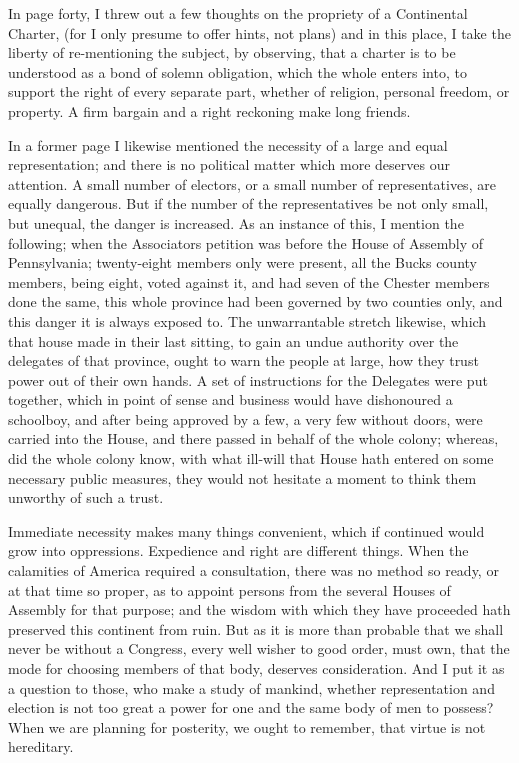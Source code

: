 \documentclass[12pt,oneside]{memoir}
\begin{document}
In page forty, I threw out a few thoughts on the propriety of a
Continental Charter, (for I only presume to offer hints, not plans)
and in this place, I take the liberty of re-mentioning the subject,
by observing, that a charter is to be understood as a bond of solemn
obligation, which the whole enters into, to support the right of
every separate part, whether of religion, personal freedom, or
property. A firm bargain and a right reckoning make long friends.

In a former page I likewise mentioned the necessity of a large and
equal representation; and there is no political matter which more
deserves our attention. A small number of electors, or a small
number of representatives, are equally dangerous. But if the number
of the representatives be not only small, but unequal, the danger is
increased. As an instance of this, I mention the following; when the
Associators petition was before the House of Assembly of
Pennsylvania; twenty-eight members only were present, all the Bucks
county members, being eight, voted against it, and had seven of the
Chester members done the same, this whole province had been governed
by two counties only, and this danger it is always exposed to. The
unwarrantable stretch likewise, which that house made in their last
sitting, to gain an undue authority over the delegates of that
province, ought to warn the people at large, how they trust power
out of their own hands. A set of instructions for the Delegates were
put together, which in point of sense and business would have
dishonoured a schoolboy, and after being approved by a few, a very
few without doors, were carried into the House, and there passed in
behalf of the whole colony; whereas, did the whole colony know, with
what ill-will that House hath entered on some necessary public
measures, they would not hesitate a moment to think them unworthy of
such a trust.

Immediate necessity makes many things convenient, which if continued
would grow into oppressions. Expedience and right are different
things. When the calamities of America required a consultation,
there was no method so ready, or at that time so proper, as to
appoint persons from the several Houses of Assembly for that purpose;
and the wisdom with which they have proceeded hath preserved this
continent from ruin. But as it is more than probable that we shall
never be without a Congress, every well wisher to good order, must
own, that the mode for choosing members of that body, deserves
consideration. And I put it as a question to those, who make a study
of mankind, whether representation and election is not too great a
power for one and the same body of men to possess? When we are
planning for posterity, we ought to remember, that virtue is not
hereditary.
\end{document}

